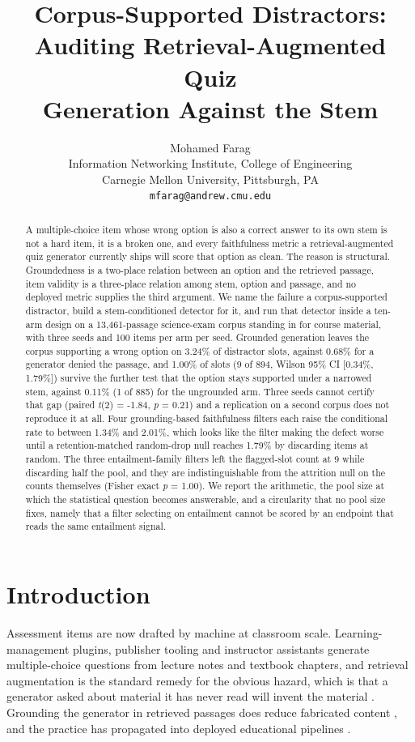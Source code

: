\documentclass[11pt]{article}
\title{Corpus-Supported Distractors: Auditing Retrieval-Augmented Quiz\\
Generation Against the Stem}
\author{Mohamed Farag \\
  Information Networking Institute, College of Engineering \\
  Carnegie Mellon University, Pittsburgh, PA \\
  \texttt{mfarag@andrew.cmu.edu}}
\begin{document}
\maketitle

\begin{abstract}
A multiple-choice item whose wrong option is also a correct answer to its own stem is not a hard item, it is a broken one, and every faithfulness metric a retrieval-augmented quiz generator currently ships will score that option as clean. The reason is structural. Groundedness is a two-place relation between an option and the retrieved passage, item validity is a three-place relation among stem, option and passage, and no deployed metric supplies the third argument. We name the failure a corpus-supported distractor, build a stem-conditioned detector for it, and run that detector inside a ten-arm design on a 13,461-passage science-exam corpus standing in for course material, with three seeds and 100 items per arm per seed. Grounded generation leaves the corpus supporting a wrong option on 3.24\% of distractor slots, against 0.68\% for a generator denied the passage, and 1.00\% of slots (9 of 894, Wilson 95\% CI [0.34\%, 1.79\%]) survive the further test that the option stays supported under a narrowed stem, against 0.11\% (1 of 885) for the ungrounded arm. Three seeds cannot certify that gap (paired \emph{t}(2) = -1.84, \emph{p} = 0.21) and a replication on a second corpus does not reproduce it at all. Four grounding-based faithfulness filters each raise the conditional rate to between 1.34\% and 2.01\%, which looks like the filter making the defect worse until a retention-matched random-drop null reaches 1.79\% by discarding items at random. The three entailment-family filters left the flagged-slot count at 9 while discarding half the pool, and they are indistinguishable from the attrition null on the counts themselves (Fisher exact \emph{p} = 1.00). We report the arithmetic, the pool size at which the statistical question becomes answerable, and a circularity that no pool size fixes, namely that a filter selecting on entailment cannot be scored by an endpoint that reads the same entailment signal.
\end{abstract}

\section{Introduction}

Assessment items are now drafted by machine at classroom scale. Learning-management plugins, publisher tooling and instructor assistants generate multiple-choice questions from lecture notes and textbook chapters, and retrieval augmentation is the standard remedy for the obvious hazard, which is that a generator asked about material it has never read will invent the material \citep{gao2023retrievalaugmented,fan2024survey,chen2024benchmarking}. Grounding the generator in retrieved passages does reduce fabricated content \citep{shuster2021retrieval}, and the practice has propagated into deployed educational pipelines \citep{swacha2025retrievalaugmented,gopi2024enhancing}.
\end{document}
